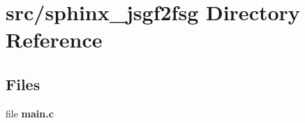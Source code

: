 \section{src/sphinx\-\_\-jsgf2fsg Directory Reference}
\label{dir_230350dfe14c7dfc5f22a5c64471a6f5}
\subsection*{Files}
\begin{DoxyCompactItemize}
\item 
file {\bfseries main.\-c}
\end{DoxyCompactItemize}
